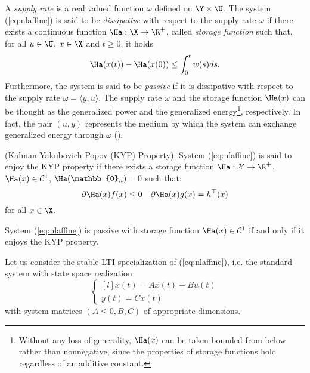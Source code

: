 A \textit{supply rate} is a real valued function $\omega$ defined on $\Y\times\U$. The  system (\ref{eq:nlaffine}) is said to be \textit{dissipative} with respect to the supply rate $\omega$ if there exists a continuous function $\Ha:\X\rightarrow\R^+$, called \textit{storage function} such that, for all $u\in\U$, $x\in\X$ and $t\geq 0$, it holds
%
\begin{equation*}
    \Ha(x(t))-\Ha(x(0)) \leq \int_0^tw(s)ds.
\end{equation*}
%
Furthermore, the system is said to be \textit{passive} if it is dissipative with respect to the supply rate $\omega = \langle y,u \rangle$. The supply rate $\omega$ and the storage function $\Ha(x)$ can be thought as the generalized power and the generalized energy\footnote{Without any loss of generality, $\Ha(x)$ can be taken bounded from below rather than nonnegative, since the properties of storage functions hold regardless of an additive constant.}, respectively. In fact, the pair $(u,y)$ represents the medium by which the system can exchange generalized energy through $\omega$ (\citealp{secchi2007control}).
%
%
\begin{defn}(Kalman-Yakubovich-Popov (KYP) Property).
%
System (\ref{eq:nlaffine}) is said to enjoy the KYP property if there exists a storage function $\Ha:\mathcal{X}\rightarrow\R^+$, $\Ha(x)\in\mathcal{C}^1$, $\Ha(\mathbb{0}_n) = 0$ such that:
\begin{equation*}
        {\partial\Ha(x)}f(x)\leq 0\quad {\partial\Ha(x)}g(x)= h^\top(x)
\end{equation*}
%
for all $x\in\X$.
%
\end{defn}
%
\begin{prop}
%
System (\ref{eq:nlaffine}) is passive with storage function $\Ha(x)\in \mathcal{C}^1$ if and only if it enjoys the KYP property.
%
\end{prop}
%
Let us consider the stable LTI specialization of (\ref{eq:nlaffine}), i.e. the standard system with state space realization
%
\begin{equation}\label{eq:lsys}
\left\{
\begin{matrix*}[l]
\dot{x}(t) = Ax(t) + Bu(t)\\
y(t) = Cx(t)
\end{matrix*}
\right.
\end{equation}
with system matrices $(A\leq 0,B,C)$ of appropriate dimensions.
